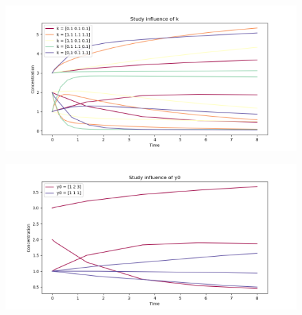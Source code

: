 \documentclass[10pt,a4paper]{article}
\begin{document}
\begin{figure}[!h]
\centering
\includegraphics[width=\textwidth]{../01_reactionKinetics/influence_k}
\end{figure}

\begin{figure}[!h]
\centering
\includegraphics[width=\textwidth]{../01_reactionKinetics/influence_y0}
\end{figure}

\FloatBarrier
\newpage
\listoffigures
\listoftables
\lstlistoflistings


\end{document}
